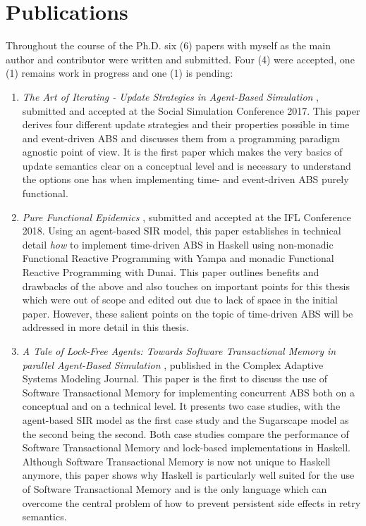 \section*{Publications}
Throughout the course of the Ph.D. six (6) papers with myself as the main author and contributor were written and submitted. Four (4) were accepted, one (1) remains work in progress and one (1) is pending:

\begin{enumerate}
	\item \textit{The Art of Iterating - Update Strategies in Agent-Based Simulation} \cite{payne_social_2019, thaler_art_2017}, submitted and accepted at the Social Simulation Conference 2017. This paper derives four different update strategies and their properties possible in time and event-driven ABS and discusses them from a programming paradigm agnostic point of view. It is the first paper which makes the very basics of update semantics clear on a conceptual level and is necessary to understand the options one has when implementing time- and event-driven ABS purely functional.
	
	\item \textit{Pure Functional Epidemics} \cite{thaler_pure_2018}, submitted and accepted at the IFL Conference 2018. Using an agent-based SIR model, this paper establishes in technical detail \textit{how} to implement time-driven ABS in Haskell using non-monadic Functional Reactive Programming with Yampa and monadic Functional Reactive Programming with Dunai. This paper outlines benefits and drawbacks of the above and also touches on important points for this thesis which were out of scope and edited out due to lack of space in the initial paper. However, these salient points on the topic of time-driven ABS will be addressed in more detail in this thesis.

	\item \textit{A Tale of Lock-Free Agents: Towards Software Transactional Memory in parallel Agent-Based Simulation} \cite{thaler_tale_2018}, published in the Complex Adaptive Systems Modeling Journal. This paper is the first to discuss the use of Software Transactional Memory for implementing concurrent ABS both on a conceptual and on a technical level. It presents two case studies, with the agent-based SIR model as the first case study and the Sugarscape model as the second being the second. Both case studies compare the performance of Software Transactional Memory and lock-based implementations in Haskell. Although Software Transactional Memory is now not unique to Haskell anymore, this paper shows why Haskell is particularly well suited for the use of Software Transactional Memory and is the only language which can overcome the central problem of how to prevent persistent side effects in retry semantics.


\end{enumerate}

